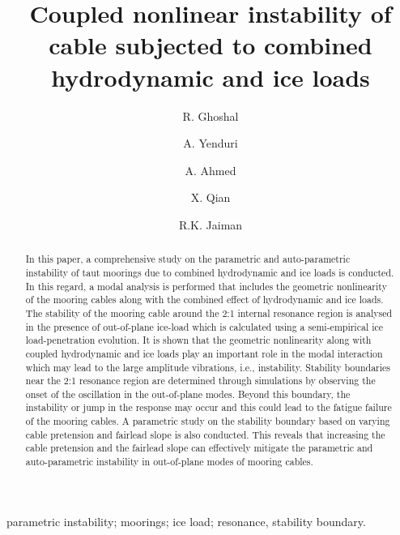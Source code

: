 \documentclass[review]{elsarticle}
\begin{document}
\begin{frontmatter}
\title{Coupled nonlinear instability of cable subjected to combined hydrodynamic and ice loads}
\author[label1]{R. Ghoshal}
\author[label1]{A. Yenduri}
\author[label1]{A. Ahmed}
\author[label2]{X. Qian}
\author[label3]{R.K. Jaiman}
\address[label1]{Keppel-NUS Corporate Laboratory, National University of Singapore, Singapore}
\address[label2]{Department of Civil and Environmental Engineering, National University of Singapore, Singapore}
\address[label3]{Department of Mechanical Engineering, National University of Singapore, Singapore}
\begin{abstract}
In this paper, a comprehensive study on the parametric and auto-parametric instability of taut moorings due to combined hydrodynamic and ice loads is conducted. In this regard, a modal analysis is performed that includes the geometric nonlinearity of the mooring cables along with the combined effect of hydrodynamic and ice loads. The stability of the mooring cable around the 2:1 internal resonance region is analysed in the presence of out-of-plane ice-load which is calculated using a semi-empirical ice load-penetration evolution. It is shown that the geometric nonlinearity along with coupled hydrodynamic and ice loads play an important role in the modal interaction which may lead to the large amplitude vibrations, i.e., instability. Stability boundaries near the 2:1 resonance region are determined through simulations by observing the onset of the oscillation in the out-of-plane modes. Beyond this boundary, the  instability or jump in the response may occur and this could lead to the fatigue failure of the mooring
cables. A parametric study on the stability boundary based on varying cable pretension and fairlead slope is also conducted. This reveals that increasing the cable pretension and the fairlead slope can effectively mitigate the parametric and auto-parametric instability in out-of-plane modes of mooring cables.
\end{abstract}
\begin{keyword}
parametric instability; moorings; ice load; resonance, stability boundary.
\end{keyword}
\end{frontmatter}
\end{document}
